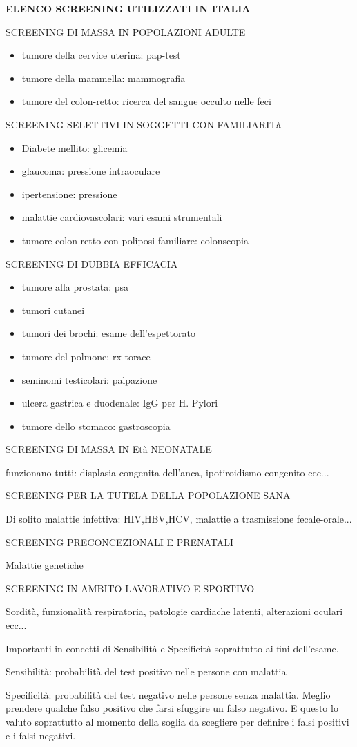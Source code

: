 \documentclass[]{article}
\begin{document}
\textbf{ELENCO SCREENING UTILIZZATI IN ITALIA}

SCREENING DI MASSA IN POPOLAZIONI ADULTE

\begin{itemize}
\item
  tumore della cervice uterina: pap-test
\item
  tumore della mammella: mammografia
\item
  tumore del colon-retto: ricerca del sangue occulto nelle feci
\end{itemize}

SCREENING SELETTIVI IN SOGGETTI CON FAMILIARITà

\begin{itemize}
\item
  Diabete mellito: glicemia
\item
  glaucoma: pressione intraoculare
\item
  ipertensione: pressione
\item
  malattie cardiovascolari: vari esami strumentali
\item
  tumore colon-retto con poliposi familiare: colonscopia
\end{itemize}

SCREENING DI DUBBIA EFFICACIA

\begin{itemize}
\item
  tumore alla prostata: psa
\item
  tumori cutanei
\item
  tumori dei brochi: esame dell'espettorato
\item
  tumore del polmone: rx torace
\item
  seminomi testicolari: palpazione
\item
  ulcera gastrica e duodenale: IgG per H. Pylori
\item
  tumore dello stomaco: gastroscopia
\end{itemize}

SCREENING DI MASSA IN Età NEONATALE

funzionano tutti: displasia congenita dell'anca, ipotiroidismo congenito
ecc...

SCREENING PER LA TUTELA DELLA POPOLAZIONE SANA

Di solito malattie infettiva: HIV,HBV,HCV, malattie a trasmissione
fecale-orale...

SCREENING PRECONCEZIONALI E PRENATALI

Malattie genetiche

SCREENING IN AMBITO LAVORATIVO E SPORTIVO

Sordità, funzionalità respiratoria, patologie cardiache latenti,
alterazioni oculari ecc...

Importanti in concetti di Sensibilità e Specificità soprattutto ai fini
dell'esame.

Sensibilità: probabilità del test positivo nelle persone con malattia

Specificità: probabilità del test negativo nelle persone senza malattia.
Meglio prendere qualche falso positivo che farsi sfuggire un falso
negativo. E questo lo valuto soprattutto al momento della soglia da
scegliere per definire i falsi positivi e i falsi negativi.
\end{document}
